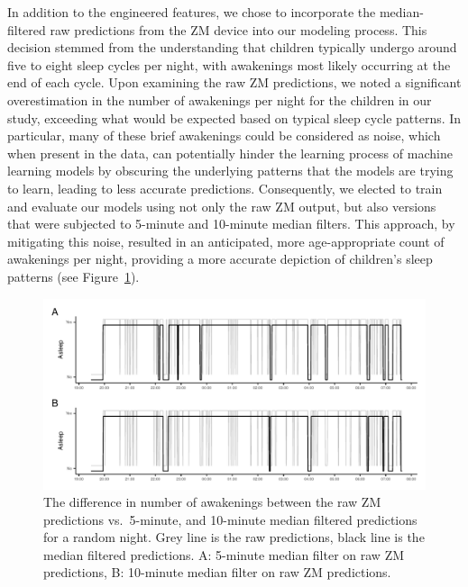 \documentclass[
  super,
  preprint,
  3p]{elsarticle}
\begin{document}
In addition to the engineered features, we chose to incorporate the
median-filtered raw predictions from the ZM device into our modeling
process. This decision stemmed from the understanding that children
typically undergo around five to eight sleep cycles per night, with
awakenings most likely occurring at the end of each
cycle\citep{galland_normal_2012}. Upon examining the raw ZM predictions,
we noted a significant overestimation in the number of awakenings per
night for the children in our study, exceeding what would be expected
based on typical sleep cycle patterns. In particular, many of these
brief awakenings could be considered as noise, which when present in the
data, can potentially hinder the learning process of machine learning
models by obscuring the underlying patterns that the models are trying
to learn, leading to less accurate predictions. Consequently, we elected
to train and evaluate our models using not only the raw ZM output, but
also versions that were subjected to 5-minute and 10-minute median
filters. This approach, by mitigating this noise, resulted in an
anticipated, more age-appropriate count of awakenings per night,
providing a more accurate depiction of children's sleep patterns (see
Figure~\ref{fig-zm-median}).

\begin{figure}[b]

{\centering \includegraphics{visuals/zm_raw_vs_filtered.pdf}

}

\caption{\label{fig-zm-median}The difference in number of awakenings
between the raw ZM predictions vs.~5-minute, and 10-minute median
filtered predictions for a random night. Grey line is the raw
predictions, black line is the median filtered predictions. A: 5-minute
median filter on raw ZM predictions, B: 10-minute median filter on raw
ZM predictions.}

\end{figure}
\end{document}
